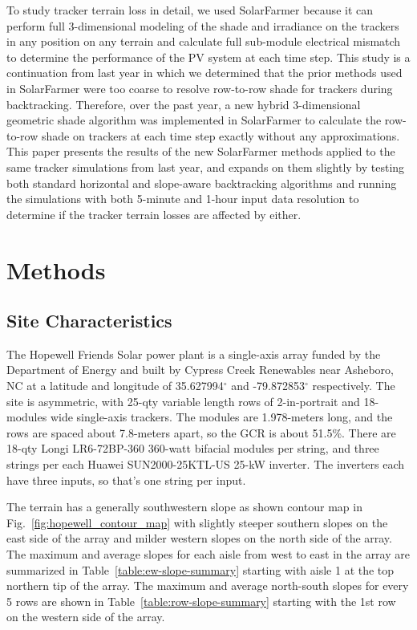 \documentclass[conference]{IEEEtran}
\begin{document}
To study tracker terrain loss in detail, we used SolarFarmer \cite{Mikofski_8547323} because it can perform full 3-dimensional modeling of the shade and irradiance on the trackers in any position on any terrain and calculate full sub-module electrical mismatch to determine the performance of the PV system at each time step. This study is a continuation from last year \cite{Mikofski_9300381} in which we determined that the prior methods used in SolarFarmer were too coarse to resolve row-to-row shade for trackers during backtracking. Therefore, over the past year, a new hybrid 3-dimensional geometric shade algorithm was implemented in SolarFarmer to calculate the row-to-row shade on trackers at each time step exactly without any approximations. This paper presents the results of the new SolarFarmer methods applied to the same tracker simulations from last year, and expands on them slightly by testing both standard horizontal and slope-aware backtracking algorithms and running the simulations with both 5-minute and 1-hour input data resolution to determine if the tracker terrain losses are affected by either.

\section{Methods}

\subsection{Site Characteristics}

The Hopewell Friends Solar power plant is a single-axis array funded by the Department of Energy and built by Cypress Creek Renewables \cite{CypressCreekRenewables2019} near Asheboro, NC at a latitude and longitude of 35.627994$^\circ$ and -79.872853$^\circ$ respectively. The site is asymmetric, with 25-qty variable length rows of 2-in-portrait and 18-modules wide single-axis trackers. The modules are 1.978-meters long, and the rows are spaced about 7.8-meters apart, so the GCR is about 51.5\%. There are 18-qty Longi LR6-72BP-360 360-watt bifacial modules per string, and three strings per each Huawei SUN2000-25KTL-US 25-kW inverter. The inverters each have three inputs, so that's one string per input.

The terrain has a generally southwestern slope as shown contour map in Fig.~\ref{fig:hopewell_contour_map} with slightly steeper southern slopes on the east side of the array and milder western slopes on the north side of the array. The maximum and average slopes for each aisle from west to east in the array are summarized in Table~\ref{table:ew-slope-summary} starting with aisle 1 at the top northern tip of the array. The maximum and average north-south slopes for every 5 rows are shown in Table~\ref{table:row-slope-summary} starting with the 1st row on the western side of the array.
\end{document}
